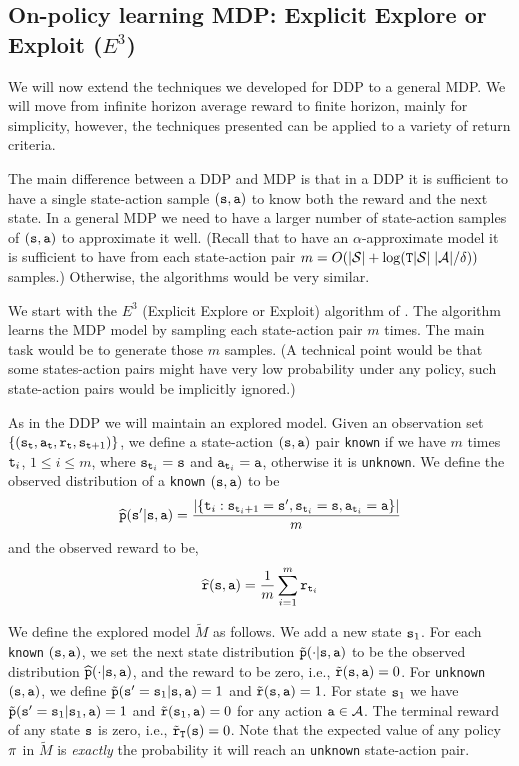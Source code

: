 \subsection{On-policy learning MDP: Explicit Explore or Exploit ($E^3$)}

We will now extend the techniques we developed for DDP to a general
MDP. We will move from infinite horizon average reward to finite
horizon, mainly for simplicity, however, the techniques presented
can be applied to a variety of return criteria.

The main difference between a DDP and MDP is that in a DDP it is sufficient to have a single state-action sample $({\tt s},{\tt a})$ to know both the reward and the next state. In a general MDP we need to have a larger number of state-action samples of $({\tt s},{\tt a})$ to approximate it well. (Recall that to have an $\alpha$-approximate model it is sufficient to have from each state-action pair $m=O(|\mathcal{S}|+\log({\tt T} |\mathcal{S}|\;|\mathcal{A}|/\delta))$ samples.)
Otherwise, the algorithms would be very similar.

We start with the $E^3$ (Explicit Explore or Exploit) algorithm of
\cite{KearnsS02}. The algorithm learns the MDP model by sampling
each state-action pair $m$ times. The main task would be to generate
those $m$ samples. (A technical point would be that some
states-action pairs might have very low probability under any
policy, such state-action pairs would be implicitly ignored.)

As in the DDP we will maintain an explored model. Given an
observation set $\{({\tt s}_{\tt t},{\tt a}_{\tt t} ,{\tt r}_{\tt t},
{\tt s}_{{\tt t}+1})\}$, we define a state-action $({\tt s},{\tt a})$
pair \texttt{known} if we have $m$ times ${\tt t}_i$, $1\leq i \leq m$,
where ${\tt s}_{{\tt t}_i}={\tt s}$ and ${\tt a}_{{\tt t}_i}={\tt a}$,
otherwise it is \texttt{unknown}. We define the observed distribution
of a \texttt{known} $({\tt s},{\tt a})$ to be
\[
\widehat{{\tt p}}({\tt s}'|{\tt s},{\tt a})= \frac{|\{{\tt t}_i
:{\tt s}_{{\tt t}_i+1}={\tt s}',{\tt s}_{{\tt t}_i}={\tt s},{\tt a}_{{\tt t}_i}={\tt a}\}|}{m}
\]
and the observed reward to be,
\[
\widehat{{\tt r}}({\tt s},{\tt a})=\frac{1}{m}\sum_{i=1}^m
{\tt r}_{{\tt t}_i}
\]


We define the explored model $\widetilde{M}$ as follows. We add a new
state ${\tt s}_1$. For each \texttt{known} $({\tt s},{\tt a})$, we set the next
state distribution $\tilde{{\tt p}}(\cdot|{\tt s},{\tt a})$ to be the
observed distribution $\widehat{{\tt p}}(\cdot|{\tt s},{\tt a})$, and the
reward to be zero, i.e., $\tilde{{\tt r}}({\tt s},{\tt a})=0$.
%
For \texttt{unknown} $({\tt s},{\tt a})$, we define
$\tilde{{\tt p}}({\tt s}'={\tt s}_1 | {\tt s},{\tt a})=1$ and
$\tilde{{\tt r}}({\tt s},{\tt a})=1$. For state ${\tt s}_1$ we
have $\tilde{{\tt p}}({\tt s}'={\tt s}_1 | {\tt s}_1,{\tt a})=1$ and
$\tilde{{\tt r}}({\tt s}_1,{\tt a})=0$ for any action
${\tt a}\in\mathcal{A}$.
The terminal reward of any state ${\tt s}$ is zero, i.e., $\tilde{{\tt r}}_{\tt T}({\tt s})=0$.
%
Note that the expected value of any policy $\pi$ in $\widetilde{M}$
is {\em exactly} the probability it will reach an \texttt{unknown}
state-action pair.

